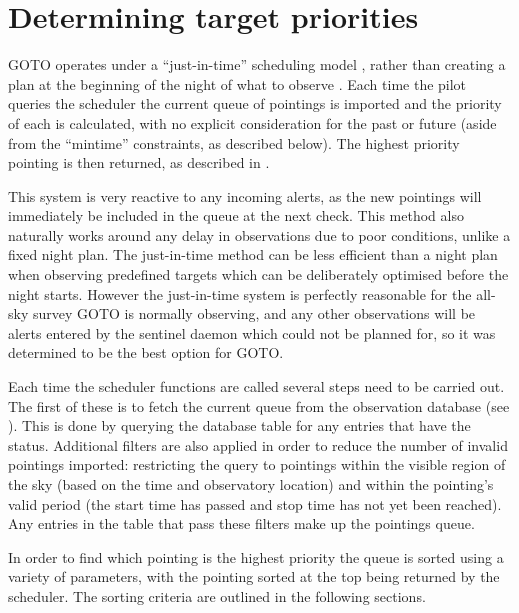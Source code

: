 \section{Determining target priorities}
\label{sec:ranking}
\begin{colsection}


\begin{colsection}

GOTO operates under a ``just-in-time'' scheduling model \citep[see, for example,][]{LCO_scheduling}, rather than creating a plan at the beginning of the night of what to observe \citep[see, for example,][]{ZTF_scheduler}. Each time the pilot queries the scheduler the current queue of pointings is imported and the priority of each is calculated, with no explicit consideration for the past or future (aside from the ``mintime'' constraints, as described below). The highest priority pointing is then returned, as described in .

This system is very reactive to any incoming alerts, as the new pointings will immediately be included in the queue at the next check. This method also naturally works around any delay in observations due to poor conditions, unlike a fixed night plan. The just-in-time method can be less efficient than a night plan when observing predefined targets which can be deliberately optimised before the night starts. However the just-in-time system is perfectly reasonable for the all-sky survey GOTO is normally observing, and any other observations will be alerts entered by the sentinel daemon which could not be planned for, so it was determined to be the best option for GOTO.\@

Each time the scheduler functions are called several steps need to be carried out. The first of these is to fetch the current queue from the observation database (see ). This is done by querying the database  table for any entries that have the  status. Additional filters are also applied in order to reduce the number of invalid pointings imported: restricting the query to pointings within the visible region of the sky (based on the time and observatory location) and within the pointing's valid period (the start time has passed and stop time has not yet been reached). Any entries in the table that pass these filters make up the pointings queue.

In order to find which pointing is the highest priority the queue is sorted using a variety of parameters, with the pointing sorted at the top being returned by the scheduler. The sorting criteria are outlined in the following sections.


\end{colsection}
\end{colsection}
